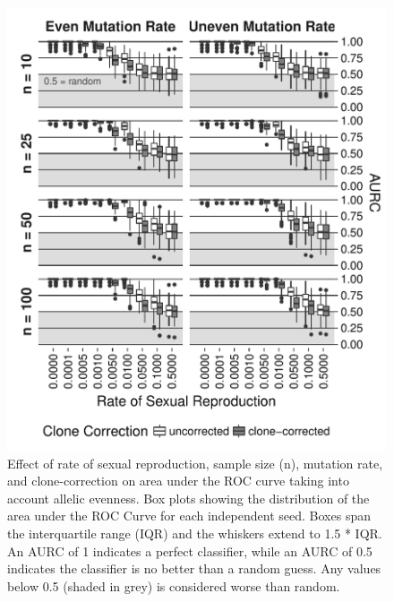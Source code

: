 \documentclass[]{article}
\theoremstyle{definition}
\theoremstyle{definition}
\theoremstyle{definition}
\theoremstyle{remark}
\begin{document}
\begin{figure}
\centering
\includegraphics[width=1.00000\textwidth]{figure/AURC_box_plot_ea.pdf}
\caption{Effect of rate of sexual reproduction, sample size (n),
mutation rate, and clone-correction on area under the ROC curve taking
into account allelic evenness. Box plots showing the distribution of the
area under the ROC Curve for each independent seed. Boxes span the
interquartile range (IQR) and the whiskers extend to 1.5 * IQR. An AURC
of 1 indicates a perfect classifier, while an AURC of 0.5 indicates the
classifier is no better than a random guess. Any values below 0.5
(shaded in grey) is considered worse than random.}\label{fig:sim2a}
\end{figure}
\end{document}

